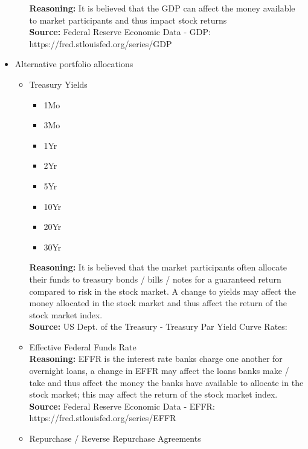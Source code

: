 \begin{itemize}
\begin{itemize}
        \textbf{Reasoning:} It is believed that the GDP can affect the money available to market
        participants and thus impact stock returns\\
        \textbf{Source:} Federal Reserve Economic Data - GDP:\\
        https://fred.stlouisfed.org/series/GDP
    \end{itemize}
    \item Alternative portfolio allocations
    \begin{itemize}
        \item Treasury Yields
        \begin{itemize}
            \item 1Mo
            \item 3Mo
            \item 1Yr
            \item 2Yr
            \item 5Yr
            \item 10Yr
            \item 20Yr
            \item 30Yr
        \end{itemize}
        \textbf{Reasoning:} It is believed that the market participants often allocate their funds
        to treasury bonds / bills / notes for a guaranteed return compared to risk in the stock market.
        A change to yields may affect the money allocated in the stock market and thus affect the
        return of the stock market index.\\
        \textbf{Source:} US Dept. of the Treasury - Treasury Par Yield Curve Rates:\\
        \item Effective Federal Funds Rate\\
        \textbf{Reasoning:} EFFR is the interest rate banks charge one another for overnight loans, a change in 
        EFFR may affect the loans banks make / take and thus affect the money the banks have available to allocate
        in the stock market; this may affect the return of the stock market index.\\
        \textbf{Source:} Federal Reserve Economic Data - EFFR:\\
        https://fred.stlouisfed.org/series/EFFR
        \item Repurchase / Reverse Repurchase Agreements\\

\end{itemize}
\end{itemize}
